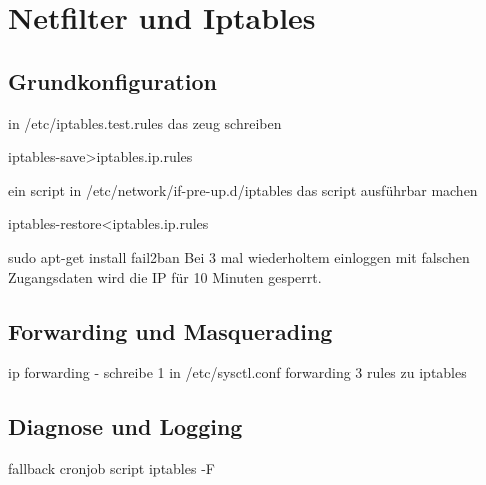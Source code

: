 \chapter{Netfilter und Iptables}
\section{Grundkonfiguration}
in /etc/iptables.test.rules das zeug schreiben

iptables-save>iptables.ip.rules

ein script in /etc/network/if-pre-up.d/iptables
das script ausführbar machen

iptables-restore<iptables.ip.rules

sudo apt-get install fail2ban
Bei 3 mal wiederholtem einloggen mit falschen Zugangsdaten wird die IP für 10 Minuten gesperrt.

\section{Forwarding und Masquerading}
ip  forwarding - schreibe 1 in /etc/sysctl.conf forwarding
3 rules zu iptables

\section{Diagnose und Logging}
fallback cronjob script iptables -F
